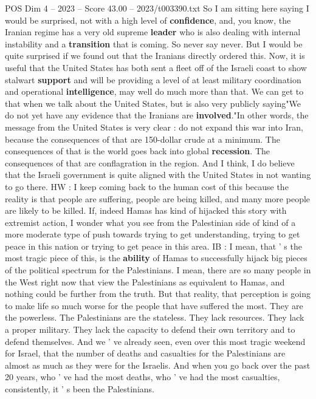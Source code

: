 \begin{textsample}{POS Dim 4 – 2023 – Score 43.00 – 2023/t003390.txt}
So I am sitting here saying I would be surprised, not with a high level of \textbf{confidence}, and, you know, the Iranian regime has a very old supreme \textbf{leader} who is also dealing with internal instability and a \textbf{transition} that is coming.
So never say never.
But I would be quite surprised if we found out that the Iranians directly ordered this.
Now, it is useful that the United States has both sent a fleet off of the Israeli coast to show stalwart \textbf{support} and will be providing a level of at least military coordination and operational \textbf{intelligence}, may well do much more than that.
We can get to that when we talk about the United States, but is also very publicly saying"We do not yet have any evidence that the Iranians are \textbf{involved}."In other words, the message from the United States is very clear : do not expand this war into Iran, because the consequences of that are 150-dollar crude at a minimum.
The consequences of that is the world goes back into global \textbf{recession}.
The consequences of that are conflagration in the region.
And I think, I do believe that the Israeli government is quite aligned with the United States in not wanting to go there.
HW : I keep coming back to the human cost of this because the reality is that people are suffering, people are being killed, and many more people are likely to be killed.
If, indeed Hamas has kind of hijacked this story with extremist action, I wonder what you see from the Palestinian side of kind of a more moderate type of push towards trying to get understanding, trying to get peace in this nation or trying to get peace in this area.
IB : I mean, that ' s the most tragic piece of this, is the \textbf{ability} of Hamas to successfully hijack big pieces of the political spectrum for the Palestinians.
I mean, there are so many people in the West right now that view the Palestinians as equivalent to Hamas, and nothing could be further from the truth.
But that reality, that perception is going to make life so much worse for the people that have suffered the most.
They are the powerless.
The Palestinians are the stateless.
They lack resources.
They lack a proper military.
They lack the capacity to defend their own territory and to defend themselves.
And we ' ve already seen, even over this most tragic weekend for Israel, that the number of deaths and casualties for the Palestinians are almost as much as they were for the Israelis.
And when you go back over the past 20 years, who ' ve had the most deaths, who ' ve had the most casualties, consistently, it ' s been the Palestinians.

\end{textsample}
